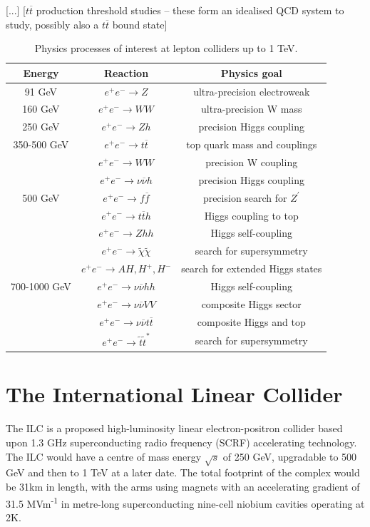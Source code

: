 [...] [$t \overline{t}$ production threshold studies -- these form an idealised QCD system to study, possibly also a $t \overline{t}$ bound state]

\begin{table}[h]
\centering
	\begin{tabular}{ c | c | c }
	\hline \hline
	\textbf{Energy} & \textbf{Reaction} & \textbf{Physics goal} \\ \hline
	 91 GeV & $e^+ e^- \rightarrow Z$ & ultra-precision electroweak \\ \hline
	 160 GeV & $e^+ e^- \rightarrow WW$ & ultra-precision W mass \\ \hline
	 250 GeV & $e^+ e^- \rightarrow Zh$ & precision Higgs coupling \\ \hline
	 350-500 GeV & $e^+ e^- \rightarrow t\overline{t}$ & top quark mass and couplings \\
	   & $e^+ e^- \rightarrow WW$ & precision W coupling \\
	   & $e^+ e^- \rightarrow \nu \overline{\nu} h$ & precision Higgs coupling \\ \hline
	 500 GeV & $e^+ e^- \rightarrow f \overline{f}$ & precision search for $Z^\prime$ \\
	   & $e^+ e^- \rightarrow t \overline{t}h$ & Higgs coupling to top \\
	   & $e^+ e^- \rightarrow Zhh$ & Higgs self-coupling \\
	   & $e^+ e^- \rightarrow \widetilde{\chi} \widetilde{\chi}$ & search for supersymmetry \\
	   & $e^+ e^- \rightarrow AH, H^+, H^-$ & search for extended Higgs states \\ \hline
	 700-1000 GeV & $e^+ e^- \rightarrow \nu \overline{\nu} hh$ & Higgs self-coupling \\
	   & $e^+ e^- \rightarrow \nu \overline{\nu} VV$ & composite Higgs sector \\
	   & $e^+ e^- \rightarrow  \nu \overline{\nu} t \overline{t}$ & composite Higgs and top \\
	   & $e^+ e^- \rightarrow \tilde{t} \tilde{t}^*$ & search for supersymmetry \\ \hline
	\end{tabular}
	\caption{Physics processes of interest at lepton colliders up to 1 TeV.}
	\label{table:colliders/physics-goals}
\end{table}

\section{The International Linear Collider}
The \acrfull{ILC} is a proposed high-luminosity linear electron-positron collider based upon 1.3 GHz superconducting radio frequency (\acrshort{SCRF}) accelerating technology. The ILC would have a centre of mass energy $\sqrt{s}$ of 250 GeV, upgradable to 500 GeV and then to 1 TeV at a later date. The total footprint of the complex would be 31km in length, with the arms using magnets with an accelerating gradient of 31.5 MVm\textsuperscript{-1} in metre-long superconducting nine-cell niobium cavities operating at 2K.

